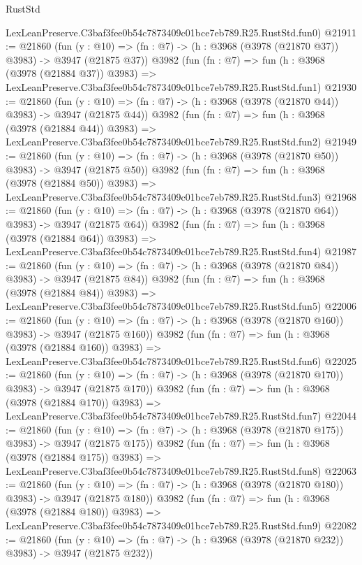 \begin{lexlean}{RustStd}
\begin{coremodule}
    LexLeanPreserve.C3baf3fee0b54c7873409c01bce7eb789.R25.RustStd.fun0)
@21911 := @21860
    (fun (y : @10) => (fn : @7) -> (h : @3968 (@3978 (@21870 @37)) @3983) -> @3947 (@21875 @37))
    @3982
    (fun (fn : @7) =>
    fun (h : @3968 (@3978 (@21884 @37)) @3983) =>
    LexLeanPreserve.C3baf3fee0b54c7873409c01bce7eb789.R25.RustStd.fun1)
@21930 := @21860
    (fun (y : @10) => (fn : @7) -> (h : @3968 (@3978 (@21870 @44)) @3983) -> @3947 (@21875 @44))
    @3982
    (fun (fn : @7) =>
    fun (h : @3968 (@3978 (@21884 @44)) @3983) =>
    LexLeanPreserve.C3baf3fee0b54c7873409c01bce7eb789.R25.RustStd.fun2)
@21949 := @21860
    (fun (y : @10) => (fn : @7) -> (h : @3968 (@3978 (@21870 @50)) @3983) -> @3947 (@21875 @50))
    @3982
    (fun (fn : @7) =>
    fun (h : @3968 (@3978 (@21884 @50)) @3983) =>
    LexLeanPreserve.C3baf3fee0b54c7873409c01bce7eb789.R25.RustStd.fun3)
@21968 := @21860
    (fun (y : @10) => (fn : @7) -> (h : @3968 (@3978 (@21870 @64)) @3983) -> @3947 (@21875 @64))
    @3982
    (fun (fn : @7) =>
    fun (h : @3968 (@3978 (@21884 @64)) @3983) =>
    LexLeanPreserve.C3baf3fee0b54c7873409c01bce7eb789.R25.RustStd.fun4)
@21987 := @21860
    (fun (y : @10) => (fn : @7) -> (h : @3968 (@3978 (@21870 @84)) @3983) -> @3947 (@21875 @84))
    @3982
    (fun (fn : @7) =>
    fun (h : @3968 (@3978 (@21884 @84)) @3983) =>
    LexLeanPreserve.C3baf3fee0b54c7873409c01bce7eb789.R25.RustStd.fun5)
@22006 := @21860
    (fun (y : @10) => (fn : @7) -> (h : @3968 (@3978 (@21870 @160)) @3983) -> @3947 (@21875 @160))
    @3982
    (fun (fn : @7) =>
    fun (h : @3968 (@3978 (@21884 @160)) @3983) =>
    LexLeanPreserve.C3baf3fee0b54c7873409c01bce7eb789.R25.RustStd.fun6)
@22025 := @21860
    (fun (y : @10) => (fn : @7) -> (h : @3968 (@3978 (@21870 @170)) @3983) -> @3947 (@21875 @170))
    @3982
    (fun (fn : @7) =>
    fun (h : @3968 (@3978 (@21884 @170)) @3983) =>
    LexLeanPreserve.C3baf3fee0b54c7873409c01bce7eb789.R25.RustStd.fun7)
@22044 := @21860
    (fun (y : @10) => (fn : @7) -> (h : @3968 (@3978 (@21870 @175)) @3983) -> @3947 (@21875 @175))
    @3982
    (fun (fn : @7) =>
    fun (h : @3968 (@3978 (@21884 @175)) @3983) =>
    LexLeanPreserve.C3baf3fee0b54c7873409c01bce7eb789.R25.RustStd.fun8)
@22063 := @21860
    (fun (y : @10) => (fn : @7) -> (h : @3968 (@3978 (@21870 @180)) @3983) -> @3947 (@21875 @180))
    @3982
    (fun (fn : @7) =>
    fun (h : @3968 (@3978 (@21884 @180)) @3983) =>
    LexLeanPreserve.C3baf3fee0b54c7873409c01bce7eb789.R25.RustStd.fun9)
@22082 := @21860
    (fun (y : @10) => (fn : @7) -> (h : @3968 (@3978 (@21870 @232)) @3983) -> @3947 (@21875 @232))

\end{coremodule}
\end{lexlean}
